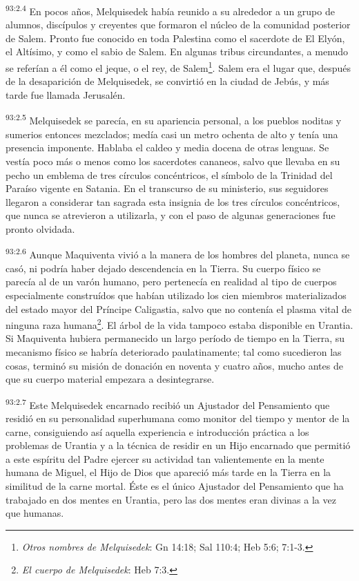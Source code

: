 \par
\textsuperscript{93:2.4} En pocos años, Melquisedek había reunido a su alrededor a un grupo de alumnos, discípulos y creyentes que formaron el núcleo de la comunidad posterior de Salem. Pronto fue conocido en toda Palestina como el sacerdote de El Elyón, el Altísimo, y como el sabio de Salem. En algunas tribus circundantes, a menudo se referían a él como el jeque, o el rey, de Salem\footnote{\textit{Otros nombres de Melquisedek}: Gn 14:18; Sal 110:4; Heb 5:6; 7:1-3.}. Salem era el lugar que, después de la desaparición de Melquisedek, se convirtió en la ciudad de Jebús, y más tarde fue llamada Jerusalén.

\par
\textsuperscript{93:2.5} Melquisedek se parecía, en su apariencia personal, a los pueblos noditas y sumerios entonces mezclados; medía casi un metro ochenta de alto y tenía una presencia imponente. Hablaba el caldeo y media docena de otras lenguas. Se vestía poco más o menos como los sacerdotes cananeos, salvo que llevaba en su pecho un emblema de tres círculos concéntricos, el símbolo de la Trinidad del Paraíso vigente en Satania. En el transcurso de su ministerio, sus seguidores llegaron a considerar tan sagrada esta insignia de los tres círculos concéntricos, que nunca se atrevieron a utilizarla, y con el paso de algunas generaciones fue pronto olvidada.

\par
\textsuperscript{93:2.6} Aunque Maquiventa vivió a la manera de los hombres del planeta, nunca se casó, ni podría haber dejado descendencia en la Tierra. Su cuerpo físico se parecía al de un varón humano, pero pertenecía en realidad al tipo de cuerpos especialmente construídos que habían utilizado los cien miembros materializados del estado mayor del Príncipe Caligastia, salvo que no contenía el plasma vital de ninguna raza humana\footnote{\textit{El cuerpo de Melquisedek}: Heb 7:3.}. El árbol de la vida tampoco estaba disponible en Urantia. Si Maquiventa hubiera permanecido un largo período de tiempo en la Tierra, su mecanismo físico se habría deteriorado paulatinamente; tal como sucedieron las cosas, terminó su misión de donación en noventa y cuatro años, mucho antes de que su cuerpo material empezara a desintegrarse.

\par
\textsuperscript{93:2.7} Este Melquisedek encarnado recibió un Ajustador del Pensamiento que residió en su personalidad superhumana como monitor del tiempo y mentor de la carne, consiguiendo así aquella experiencia e introducción práctica a los problemas de Urantia y a la técnica de residir en un Hijo encarnado que permitió a este espíritu del Padre ejercer su actividad tan valientemente en la mente humana de Miguel, el Hijo de Dios que apareció más tarde en la Tierra en la similitud de la carne mortal. Éste es el único Ajustador del Pensamiento que ha trabajado en dos mentes en Urantia, pero las dos mentes eran divinas a la vez que humanas.

